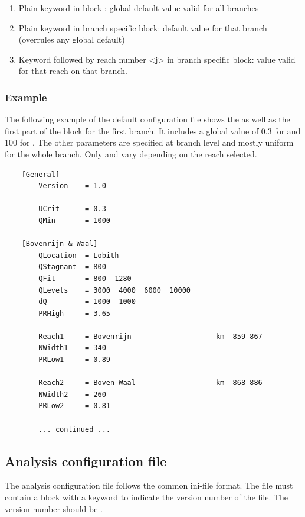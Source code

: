 \begin{enumerate}
\item Plain keyword in block \keyw{[General]}: global default value valid for all branches
\item Plain keyword in branch specific block: default value for that branch (overrules any global default)
\item Keyword followed by reach number <j> in branch specific block: value valid for that reach on that branch.
\end{enumerate}

\subsubsection*{Example}

The following example of the default  configuration file shows the \keyw{[General]} as well as the first part of the  block for the first branch.
It includes a global value of 0.3 for  and 100 for .
The other parameters are specified at branch level and mostly uniform for the whole branch.
Only  and  vary depending on the reach selected.

\begin{Verbatim}
    [General]
        Version    = 1.0

        UCrit      = 0.3
        QMin       = 1000

    [Bovenrijn & Waal]
        QLocation  = Lobith
        QStagnant  = 800
        QFit       = 800  1280
        QLevels    = 3000  4000  6000  10000
        dQ         = 1000  1000
        PRHigh     = 3.65
        
        Reach1     = Bovenrijn                    km  859-867
        NWidth1    = 340
        PRLow1     = 0.89
        
        Reach2     = Boven-Waal                   km  868-886
        NWidth2    = 260
        PRLow2     = 0.81

        ... continued ...
\end{Verbatim}

\subsection{Analysis configuration file}\label{app-v1:config}

The analysis configuration file follows the common ini-file format.
The file must contain a \keyw{[General]} block with a keyword  to indicate the version number of the file.
The version number should be .

